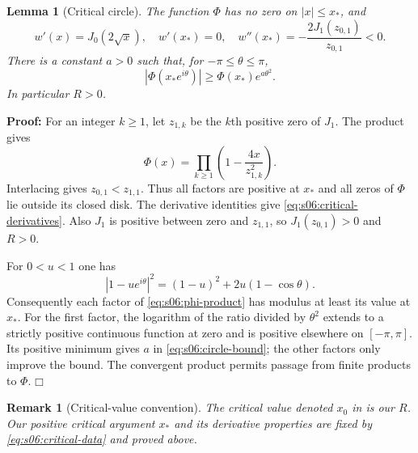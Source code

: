 \documentclass[a4paper,10pt]{article}
\numberwithin{equation}{section}
\theoremstyle{paperplain}
\newtheorem{lmm}[thm]{Lemma}
\theoremstyle{paperremark}
\newtheorem{rmk}{Remark}[section]
\theoremstyle{paperplain}
\newenvironment{prf}{\noindent \textbf{Proof: }}{\hfill $\mdlgwhtsquare$\par\addvspace{0.5\baselineskip}}
\begin{document}
\begin{lmm}[Critical circle]\label{lmm:s06:critical-circle}
The function $\Phi$ has no zero on $|x|\leq x_*$, and
\begin{equation}\label{eq:s06:critical-derivatives}
 w'(x)=J_0(2\sqrt x),\quad w'(x_*)=0,\quad
 w''(x_*)=-\frac{2J_1(z_{0,1})}{z_{0,1}}<0.
\end{equation}
There is a constant $a>0$ such that, for $-\pi\leq\theta\leq\pi$,
\begin{equation}\label{eq:s06:circle-bound}
 |\Phi(x_*e^{i\theta})|
       \geq\Phi(x_*)e^{a\theta^2}.
\end{equation}
In particular $R>0$.
\end{lmm}
\begin{prf}
For an integer $k\geq1$, let $z_{1,k}$ be the $k$th positive zero
of $J_1$. The product \cite[(10.21.15)]{DLMF} gives
\begin{equation}\label{eq:s06:phi-product}
 \Phi(x)=\prod_{k\geq1}\left(1-\frac{4x}{z_{1,k}^2}\right).
\end{equation}
Interlacing \cite[(10.21.2)]{DLMF} gives
$z_{0,1}<z_{1,1}$. Thus all factors are positive at $x_*$ and all
zeros of $\Phi$ lie outside its closed disk.
The derivative identities \cite[(10.6.6), (10.6.3)]{DLMF} give
\eqref{eq:s06:critical-derivatives}. Also $J_1$ is positive between
zero and $z_{1,1}$, so $J_1(z_{0,1})>0$ and $R>0$.

For $0<u<1$ one has
\[
 |1-ue^{i\theta}|^2=(1-u)^2+2u(1-\cos\theta).
\]
Consequently each factor of \eqref{eq:s06:phi-product} has modulus
at least its value at $x_*$. For the first factor, the logarithm
of the ratio divided by $\theta^2$ extends to a strictly positive
continuous function at zero and is positive elsewhere on
$[-\pi,\pi]$. Its positive minimum gives $a$ in
\eqref{eq:s06:circle-bound}; the other factors only improve the
bound. The convergent product permits passage from finite products
to $\Phi$.
\end{prf}

\begin{rmk}[Critical-value convention]
The critical value denoted $x_0$ in
\cite[\S 6, (17) and Proof~6.3]{MaZ00} is our $R$.
Our positive critical argument $x_*$ and its derivative properties
are fixed by \eqref{eq:s06:critical-data} and proved above.
\end{rmk}
\end{document}
